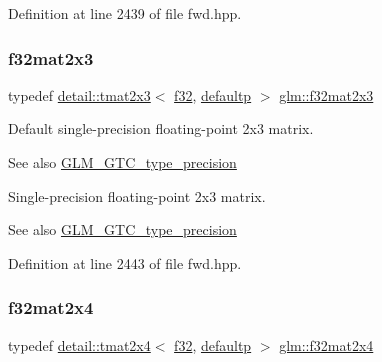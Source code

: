 Definition at line 2439 of file fwd.\+hpp.

\mbox{\label{group__gtc__type__precision_ga5ad96c3a7d4c81520d1f30bf5dcdc2b6}} 
\subsubsection{\texorpdfstring{f32mat2x3}{f32mat2x3}}
{\footnotesize\ttfamily typedef \hyperlink{structglm_1_1detail_1_1tmat2x3}{detail\+::tmat2x3}$<$ \hyperlink{group__gtc__type__precision_ga0ec999b57f5330d9021256e96038df04}{f32}, \hyperlink{namespaceglm_a0f04f086094c747d227af4425893f545a9d21ccd8b5a009ec7eb7677befc3bf51}{defaultp} $>$ \hyperlink{group__gtc__type__precision_ga5ad96c3a7d4c81520d1f30bf5dcdc2b6}{glm\+::f32mat2x3}}

Default single-\/precision floating-\/point 2x3 matrix. \begin{DoxySeeAlso}{See also}
\hyperlink{group__gtc__type__precision}{G\+L\+M\+\_\+\+G\+T\+C\+\_\+type\+\_\+precision}
\end{DoxySeeAlso}
Single-\/precision floating-\/point 2x3 matrix. \begin{DoxySeeAlso}{See also}
\hyperlink{group__gtc__type__precision}{G\+L\+M\+\_\+\+G\+T\+C\+\_\+type\+\_\+precision} 
\end{DoxySeeAlso}


Definition at line 2443 of file fwd.\+hpp.

\mbox{\label{group__gtc__type__precision_gaba05bfeff59b12ea8e8ad2f6bfd8eece}} 
\subsubsection{\texorpdfstring{f32mat2x4}{f32mat2x4}}
{\footnotesize\ttfamily typedef \hyperlink{structglm_1_1detail_1_1tmat2x4}{detail\+::tmat2x4}$<$ \hyperlink{group__gtc__type__precision_ga0ec999b57f5330d9021256e96038df04}{f32}, \hyperlink{namespaceglm_a0f04f086094c747d227af4425893f545a9d21ccd8b5a009ec7eb7677befc3bf51}{defaultp} $>$ \hyperlink{group__gtc__type__precision_gaba05bfeff59b12ea8e8ad2f6bfd8eece}{glm\+::f32mat2x4}}

